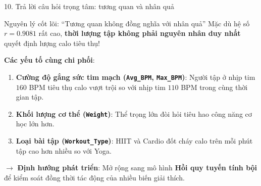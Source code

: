 \documentclass[aspectratio=169, 10pt]{beamer}
\begin{document}
\begin{frame}{10. Trả lời câu hỏi trọng tâm: tương quan và nhân quả}
    \begin{block}{Nguyên lý cốt lõi: ``Tương quan không đồng nghĩa với nhân quả''}
        Mặc dù hệ số $r = 0.9081$ rất cao, \textbf{thời lượng tập không phải nguyên nhân duy nhất} quyết định lượng calo tiêu thụ!
    \end{block}
    \vspace{5pt}
    \textbf{Các yếu tố cùng chi phối}:
    \begin{enumerate}
        \item \textbf{Cường độ gắng sức tim mạch (\texttt{Avg\_BPM}, \texttt{Max\_BPM})}: Người tập ở nhịp tim $160$ BPM tiêu thụ calo vượt trội so với nhịp tim $110$ BPM trong cùng thời gian tập.
        \item \textbf{Khối lượng cơ thể (\texttt{Weight})}: Thể trọng lớn đòi hỏi tiêu hao công năng cơ học lớn hơn.
        \item \textbf{Loại bài tập (\texttt{Workout\_Type})}: HIIT và Cardio đốt cháy calo trên mỗi phút tập cao hơn nhiều so với Yoga.
    \end{enumerate}
    \vspace{3pt}
    $\longrightarrow$ \textbf{Định hướng phát triển}: Mở rộng sang mô hình \textbf{Hồi quy tuyến tính bội} để kiểm soát đồng thời tác động của nhiều biến giải thích.
\end{frame}
\end{document}
